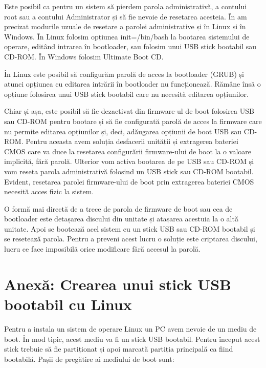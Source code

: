 Este posibil ca pentru un sistem să pierdem parola administrativă, a contului
root sau a contului Administrator și să fie nevoie de resetarea acesteia. În
 am precizat modurile
uzuale de resetare a parolei administrative și în Linux și în Windows. În Linux
folosim opțiunea init=/bin/bash la bootarea sistemului de operare, editând
intrarea în bootloader, sau folosim unui USB stick bootabil sau CD-ROM. În
Windows folosim Ultimate Boot CD.

În Linux este posibil să configurăm parolă de acces la bootloader (GRUB) și
atunci opțiunea cu editarea intrării în bootloader nu funcționează. Rămâne însă
o opțiune folosirea unui USB stick bootabil care nu necesită editarea
opțiunilor.

Chiar și așa, este posibil să fie dezactivat din firmware-ul de boot folosirea
USB sau CD-ROM pentru bootare și să fie configurată parolă de acces la firmware
care nu permite editarea opțiunilor și, deci, adăugarea opțiunii de boot USB sau
CD-ROM. Pentru aceasta avem soluția desfacerii unității și extragerea bateriei
CMOS care va duce la resetarea configurării firmware-ului de boot la o valoare
implicită, fără parolă. Ulterior vom activa bootarea de pe USB sau CD-ROM și vom
reseta parola administrativă folosind un USB stick sau CD-ROM bootabil. Evident,
resetarea parolei firmware-ului de boot prin extragerea bateriei CMOS necesită
acces fizic la sistem.

O formă mai directă de a trece de parola de firmware de boot sau cea de
bootloader este detașarea discului din unitate și atașarea acestuia la o altă
unitate. Apoi se bootează acel sistem cu un stick USB sau CD-ROM bootabil și se
resetează parola. Pentru a preveni acest lucru o soluție este criptarea
discului, lucru ce face imposibilă orice modificare fără accesul la parolă.

\section{Anexă: Crearea unui stick USB bootabil cu Linux}
\label{sec:boot-usb}

Pentru a instala un sistem de operare Linux un PC avem nevoie de un mediu de
boot. În mod tipic, acest mediu va fi un stick USB bootabil. Pentru început
acest stick trebuie să fie partiționat și apoi marcată partiția principală ca
fiind bootabilă. Pașii de pregătire ai mediului de boot sunt:

